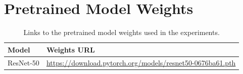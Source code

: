 \chapter{Pretrained Model Weights}\label{app:D}

\begin{table}[h]
    \centering
    \caption{Links to the pretrained model weights used in the experiments.}
    \renewcommand{\arraystretch}{1.3}
    \begin{tabular}{lp{12cm}}
        \toprule
        \textbf{Model} & \textbf{Weights URL} \\
        \midrule
        \ac{ResNet}-50 & \url{https://download.pytorch.org/models/resnet50-0676ba61.pth} \\
        \bottomrule
    \end{tabular}
    \label{tab:model_weights}
\end{table}
